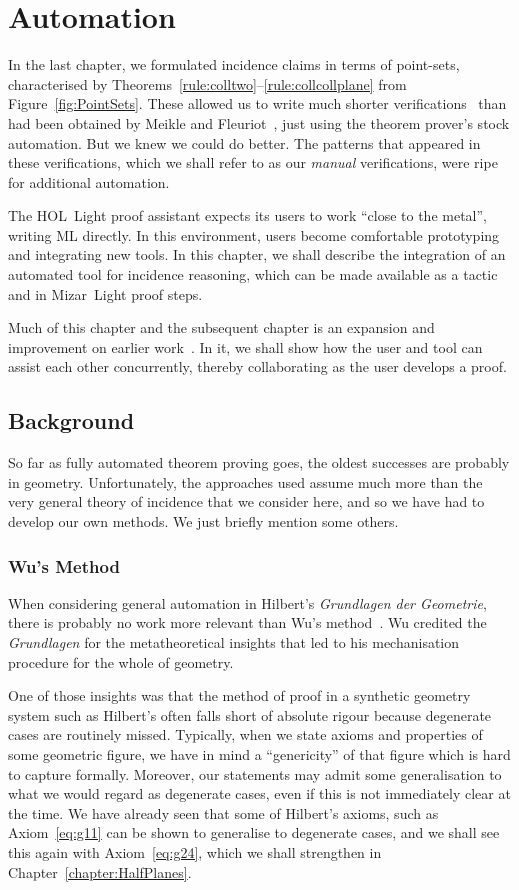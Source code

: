 \chapter{Automation}\label{chapter:Automation}
In the last chapter, we formulated incidence claims in terms of point-sets, characterised by Theorems~\ref{rule:colltwo}--\ref{rule:collcollplane} from Figure~\ref{fig:PointSets}. These allowed us to write much shorter verifications~\cite{ScottMScThesis} than had been obtained by Meikle and Fleuriot~\cite{MeikleFleuriotFormalizingHilbert}, just using the theorem prover's stock automation. But we knew we could do better. The patterns that appeared in these verifications, which we shall refer to as our \emph{manual} verifications, were ripe for additional automation.

The HOL~Light proof assistant expects its users to work ``close to the metal'', writing ML directly. In this environment, users become comfortable prototyping and  integrating new tools. In this chapter, we shall describe the integration of an automated tool for incidence reasoning, which can be made available as a tactic and in Mizar~Light proof steps.

Much of this chapter and the subsequent chapter is an expansion and improvement on earlier work~\cite{ScottExploring,ScottComposable,ScottCombinator}. In it, we shall show how the user and tool can assist each other concurrently, thereby collaborating as the user develops a proof.

\section{Background}
So far as fully automated theorem proving goes, the oldest successes are probably in geometry. Unfortunately, the approaches used assume much more than the very general theory of incidence that we consider here, and so we have had to develop our own methods. We just briefly mention some others.

\subsection{Wu's Method}
When considering general automation in Hilbert's \emph{Grundlagen der Geometrie}, there is probably no work more relevant than Wu's method~\cite{WuMechanicalTheoremProving}. Wu credited the \emph{Grundlagen} for the metatheoretical insights that led to his mechanisation procedure for the whole of geometry.

One of those insights was that the method of proof in a synthetic geometry system such as Hilbert's often falls short of absolute rigour because degenerate cases are routinely missed. Typically, when we state axioms and properties of some geometric figure, we have in mind a ``genericity'' of that figure which is hard to capture formally. Moreover, our statements may admit some generalisation to what we would regard as degenerate cases, even if this is not immediately clear at the time. We have already seen that some of Hilbert's axioms, such as Axiom~\ref{eq:g11} can be shown to generalise to degenerate cases, and we shall see this again with Axiom~\ref{eq:g24}, which we shall strengthen in Chapter~\ref{chapter:HalfPlanes}.

